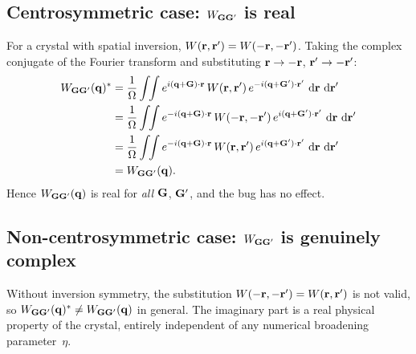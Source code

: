 \documentclass[11pt,a4paper]{article}
\begin{document}
\subsection{Centrosymmetric case: $W_{\vb{GG}'}$ is real}

For a crystal with spatial inversion, $W(\vb{r},\vb{r}') =
W(-\vb{r},-\vb{r}')$.  Taking the complex conjugate of the Fourier
transform and substituting $\vb{r} \to -\vb{r}$,
$\vb{r}' \to -\vb{r}'$:
\begin{align}
  W_{\vb{GG}'}(\vb{q})^*
  &= \frac{1}{\Omega}\int\!\!\int
     e^{i(\vb{q}+\vb{G})\cdot\vb{r}}\,
     W(\vb{r},\vb{r}')\,
     e^{-i(\vb{q}+\vb{G}')\cdot\vb{r}'}\,
     \dd{\vb{r}}\,\dd{\vb{r}'}
  \notag\\
  &= \frac{1}{\Omega}\int\!\!\int
     e^{-i(\vb{q}+\vb{G})\cdot\vb{r}}\,
     W(-\vb{r},-\vb{r}')\,
     e^{i(\vb{q}+\vb{G}')\cdot\vb{r}'}\,
     \dd{\vb{r}}\,\dd{\vb{r}'}
  \notag\\
  &= \frac{1}{\Omega}\int\!\!\int
     e^{-i(\vb{q}+\vb{G})\cdot\vb{r}}\,
     W(\vb{r},\vb{r}')\,
     e^{i(\vb{q}+\vb{G}')\cdot\vb{r}'}\,
     \dd{\vb{r}}\,\dd{\vb{r}'}
  \notag\\
  &= W_{\vb{GG}'}(\vb{q}).
\end{align}
Hence $W_{\vb{GG}'}(\vb{q})$ is real for \emph{all} $\vb{G}$,
$\vb{G}'$, and the bug has no effect.

\subsection{Non-centrosymmetric case: $W_{\vb{GG}'}$ is genuinely
            complex}

Without inversion symmetry, the substitution
$W(-\vb{r},-\vb{r}') = W(\vb{r},\vb{r}')$ is not valid, so
$W_{\vb{GG}'}(\vb{q})^* \neq W_{\vb{GG}'}(\vb{q})$ in general.
The imaginary part is a real physical property of the crystal,
entirely independent of any numerical broadening parameter~$\eta$.
\end{document}
